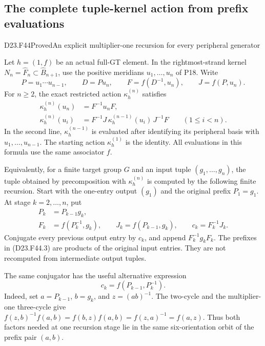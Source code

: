 \subsection{The complete tuple-kernel action from prefix evaluations}

\begin{statement}{D23.F44}{Proved}{An explicit multiplier-one recursion for every peripheral generator}
\end{statement}
Let $h=(1,f)$ be an actual full-GT element. In the
rightmost-strand kernel $N_n=\widehat F_n\subset\widehat B_{n+1}$,
use the positive meridians $u_1,\ldots,u_n$ of P18. Write
\[
 P=u_1\cdots u_{n-1},\qquad D=P u_n,
 \qquad F=f(D^{-1},u_n),\qquad J=f(P,u_n).
                                                        \tag{D23.F44.1}
\]
For $n\geq2$, the exact restricted action $\kappa_h^{(n)}$
satisfies
\[
\begin{split}
 \kappa_h^{(n)}(u_n)&=F^{-1}u_nF,\\
 \kappa_h^{(n)}(u_i)&=F^{-1}J\,
       \kappa_h^{(n-1)}(u_i)\,J^{-1}F
                    \qquad(1\leq i<n).
\end{split}
                                                        \tag{D23.F44.2}
\]
In the second line, $\kappa_h^{(n-1)}$ is evaluated after
identifying its peripheral basis with $u_1,\ldots,u_{n-1}$.
The starting action $\kappa_h^{(1)}$ is the identity.
All evaluations in this formula use the same associator $f$.

Equivalently, for a finite target group $G$ and an input
tuple $(g_1,\ldots,g_n)$, the tuple obtained by precomposition
with $\kappa_h^{(n)}$ is computed by the following finite
recursion. Start with the one-entry output $(g_1)$ and the
original prefix $P_1=g_1$. At stage $k=2,\ldots,n$, put
\[
 \begin{split}
 P_k&=P_{k-1}g_k,\\
 F_k&=f(P_k^{-1},g_k),\qquad
 J_k=f(P_{k-1},g_k),\qquad c_k=F_k^{-1}J_k.
 \end{split}
                                                        \tag{D23.F44.3}
\]
Conjugate every previous output entry by $c_k$, and append
$F_k^{-1}g_kF_k$. The prefixes in (D23.F44.3) are products
of the original input entries. They are not recomputed
from intermediate output tuples.

The same conjugator has the useful alternative expression
\[
                    c_k=f(P_{k-1},P_k^{-1}).
                                                        \tag{D23.F44.10}
\]
Indeed, set $a=P_{k-1}$, $b=g_k$, and $z=(ab)^{-1}$.
The two-cycle and the multiplier-one three-cycle give
$f(z,b)^{-1}f(a,b)=f(b,z)f(a,b)=f(z,a)^{-1}=f(a,z)$.
Thus both factors needed at one recursion stage lie in
the same six-orientation orbit of the prefix pair $(a,b)$.

